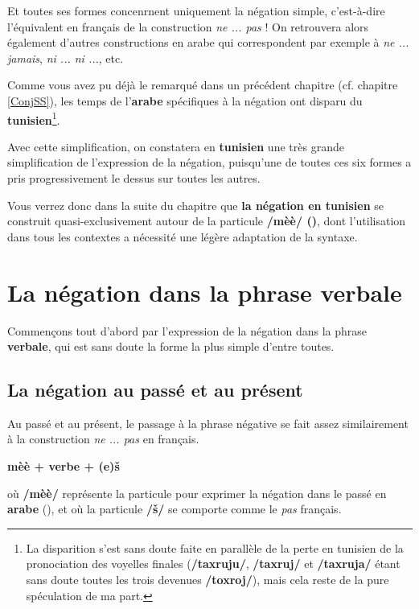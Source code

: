 Et toutes ses formes concenrnent uniquement la négation simple, c'est-à-dire l'équivalent en français de la construction \textit{ne ... pas} ! On retrouvera alors également d'autres constructions en arabe qui correspondent par exemple à \textit{ne ... jamais}, \textit{ni ... ni ...}, etc.

Comme vous avez pu déjà le remarqué dans un précédent chapitre (cf. chapitre \ref{ConjSS}), les temps de l'\textbf{arabe} spécifiques à la négation ont disparu du \textbf{tunisien}\footnote{La disparition s'est sans doute faite en parallèle de la perte en tunisien de la pronociation des voyelles finales (\textbf{/taxruju/}, \textbf{/taxruj/} et \textbf{/taxruja/} étant sans doute toutes les trois devenues \textbf{/toxroj/}), mais cela reste de la pure spéculation de ma part.}. 

Avec cette simplification, on constatera en \textbf{tunisien} une très grande simplification de l'expression de la négation, puisqu'une de toutes ces six formes a pris progressivement le dessus sur toutes les autres.

Vous verrez donc dans la suite du chapitre que \textbf{la négation en tunisien} se construit quasi-exclusivement autour de la particule \textbf{/mèè/ ()}, dont \linebreak l'utilisation dans tous les contextes a nécessité une légère adaptation de la syntaxe.

\section{La négation dans la phrase verbale}
Commençons tout d'abord par l'expression de la négation dans la phrase \textbf{verbale}, qui est sans doute la forme la plus simple d'entre toutes. 

\subsection{La négation au passé et au présent}
Au passé et au présent, le passage à la phrase négative se fait assez similairement à la construction \textit{ne ... pas} en français. 

\begin{center}
    \textbf{\Large mèè + verbe + (e)\v{s}}
\end{center}

où \textbf{/mèè/} représente la particule pour exprimer la négation dans le passé en \textbf{arabe} (), et où la particule \textbf{/\v{s}/} se comporte comme le \textit{pas} français.

